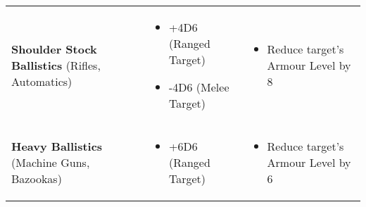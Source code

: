 \begin{center}
\begin{xltabular}{\textwidth}{|p{.25\textwidth} p{.3\textwidth} p{.35\textwidth}|}
        \raggedright\textbf{Shoulder Stock Ballistics} (Rifles, Automatics) &
            \begin{itemize}
                \item +4D6 (Ranged Target)
                \item -4D6 (Melee Target)
            \end{itemize} &
                \begin{itemize}
                    \item Reduce target’s Armour Level by 8
                \end{itemize} \\
        \raggedright\textbf{Heavy Ballistics} (Machine Guns, Bazookas) &
            \begin{itemize}
                \item +6D6 (Ranged Target)
            \end{itemize} &
                \begin{itemize}
                    \item Reduce target’s Armour Level by 6
                \end{itemize} \\
        \hline
    \end{xltabular}
\end{center}